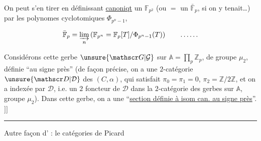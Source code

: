 On peut s'en tirer en définissant \uline{canoniqt} un
$\mathbb F_{p^2}$ (ou $=$ un $\bar{\mathbb F}_p$, si on y tenait\ldots) par les polynomes
cyclotomiques $\Phi_{p^n-1}$,

\[
\bar{\mathbb F}_p=\varinjlim_n\left(\mathbb F_{p^n}=\mathbb F_p[T]/\Phi_{p^n-1}(T)\right)
\qquad \ldots\ldots
\]
\unsure{;}


Considérons cette gerbe $\unsure{\mathscr G|\mathcal G}$  sur $\mathbb A=\prod_p\mathbb Z_p$, de
groupe $\mu_2$, définie ``au signe près'' (de
façon précise, on a une $2$-catégorie $\unsure{\mathscr D|\mathcal D}$ des $(C,\alpha)$,
qui satisfait $\pi_0=\pi_1=0$, $\pi_2=\mathbb Z/2\mathbb Z$, et  on
a   indexée par $\mathscr D$, i.e. un $2$ foncteur
de $\mathscr D$ dans la $2$-catégorie des  gerbes sur $\mathbb A$,
groupe $\mu_2$). Dans cette gerbe, on a une
``\uline{section définie à isom can. au signe près}''. $]]$


\noindent\rule{2cm}{0.4pt}
Autre façon d' : le  
catégories de Picard 



